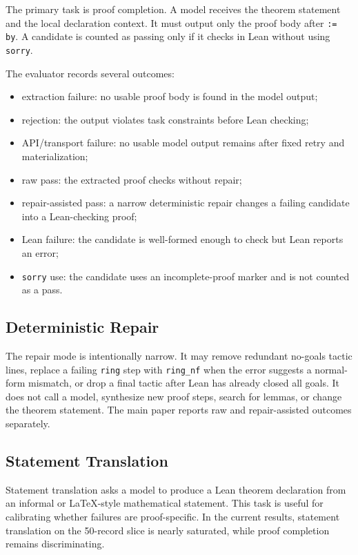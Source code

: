 The primary task is proof completion. A model receives the theorem statement
and the local declaration context. It must output only the proof body after
\texttt{:= by}. A candidate is counted as passing only if it checks in Lean
without using \texttt{sorry}.

The evaluator records several outcomes:

\begin{itemize}
\item extraction failure: no usable proof body is found in the model output;
\item rejection: the output violates task constraints before Lean checking;
\item API/transport failure: no usable model output remains after fixed retry
and materialization;
\item raw pass: the extracted proof checks without repair;
\item repair-assisted pass: a narrow deterministic repair changes a failing
candidate into a Lean-checking proof;
\item Lean failure: the candidate is well-formed enough to check but Lean
reports an error;
\item \texttt{sorry} use: the candidate uses an incomplete-proof marker and is not
counted as a pass.
\end{itemize}

\subsection{Deterministic Repair}

The repair mode is intentionally narrow. It may remove redundant no-goals tactic
lines, replace a failing \texttt{ring} step with \texttt{ring\_nf} when the
error suggests a normal-form mismatch, or drop a final tactic after Lean has
already closed all goals. It does not call a model, synthesize new proof steps,
search for lemmas, or change the theorem statement. The main paper reports raw
and repair-assisted outcomes separately.

\subsection{Statement Translation}

Statement translation asks a model to produce a Lean theorem declaration from
an informal or LaTeX-style mathematical statement. This task is useful for
calibrating whether failures are proof-specific. In the current results,
statement translation on the 50-record slice is nearly saturated, while proof
completion remains discriminating.

